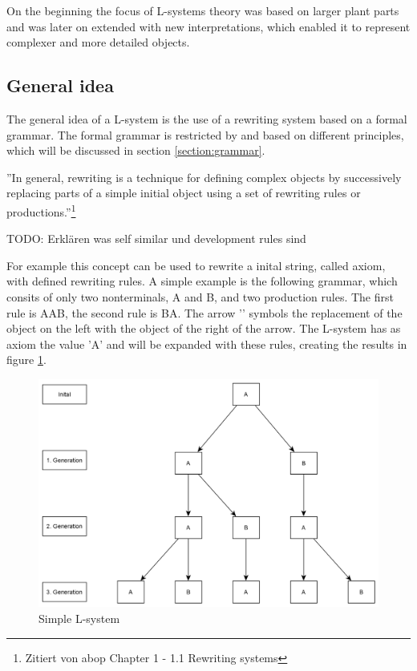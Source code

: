 \documentclass[english]{cpp-hmwk}
\begin{document}
On the beginning the focus of L-systems theory was based on larger plant parts and was later on extended with new interpretations, which enabled it to represent complexer and more detailed objects.

\subsection{General idea}
The general idea of a L-system is the use of a rewriting system based on a formal grammar. The formal grammar is restricted by and based on different principles, which will be discussed in section \ref{section:grammar}.

''In general, rewriting is a technique for defining complex objects by successively replacing parts of a simple initial object using a set of rewriting rules or productions.''\footnote{Zitiert von abop Chapter 1  - 1.1 Rewriting systems}


\bigskip

TODO: Erklären was self similar und development rules sind

\bigskip


For example this concept can be used to rewrite a inital string, called axiom, with defined rewriting rules.
A simple example is the following grammar, which consits of only two nonterminals, A and B, and two production rules. 
The first rule is A\rightarrow AB, the second rule is B\rightarrow A. The arrow '\rightarrow' symbols the replacement of the object on the left with the object of the right of the arrow.
The L-system has as axiom the value 'A' and will be expanded with these rules, creating the results in figure \ref{figure:simple_lsystem}.

\begin{figure}[h!]
	\centering
	\includegraphics[width=0.7\columnwidth]{../graphs/Examples/simple_lsystem.png}
	\caption{Simple L-system}
	\label{figure:simple_lsystem}
\end{figure}
\end{document}
